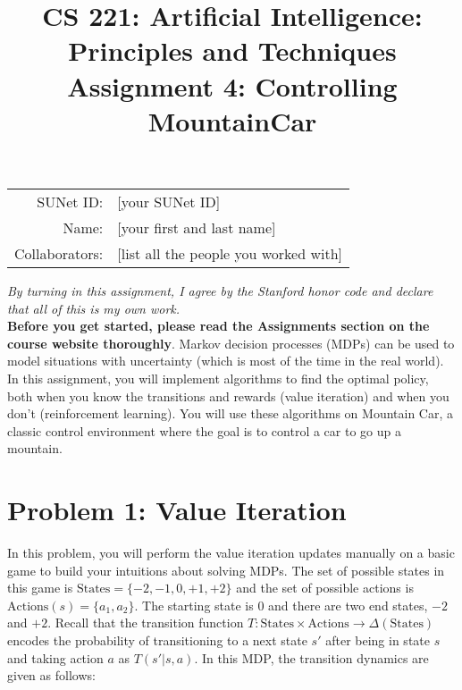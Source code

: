 \documentclass{article}
\title{\textbf{CS 221: Artificial Intelligence:\\ Principles and Techniques} \\Assignment 4: Controlling MountainCar}
\theoremstyle{case}
\theoremstyle{definition}
\begin{document}
\newtheorem*{lemma}{Lemma}

\maketitle

\begin{center}
\begin{tabular}{rl}
SUNet ID: & [your SUNet ID] \\
Name: & [your first and last name] \\
Collaborators: & [list all the people you worked with]
\end{tabular}
\end{center}
\textit{By turning in this assignment, I agree by the Stanford honor code and declare
that all of this is my own work.} \\
\fontsize{12pt}{16pt}\selectfont
\textbf{Before you get started, please read the Assignments section on the course website thoroughly}.
\newline
\newline
Markov decision processes (MDPs) can be used to model situations with uncertainty
(which is most of the time in the real world).
In this assignment, you will implement algorithms to find the optimal policy,
both when you know the transitions and rewards (value iteration)
and when you don't (reinforcement learning).
You will use these algorithms on Mountain Car, a classic control environment
where the goal is to control a car to go up a mountain.

\newpage
\section*{Problem 1: Value Iteration}

In this problem, you will perform the value iteration updates manually on a basic game to build your intuitions about solving MDPs.
The set of possible states in this game is $\text{States} = \{-2, -1, 0, +1, +2\}$ and the set of possible actions is $\text{Actions}(s) = \{a_1, a_2\}$.
The starting state is $0$ and there are two end states, $-2$ and $+2$. Recall that the transition function $T: \text{States} \times \text{Actions} \rightarrow \Delta(\text{States})$
encodes the probability of transitioning to a next state $s'$ after being in state $s$ and taking action $a$ as $T(s'|s,a)$.
In this MDP, the transition dynamics are given as follows:
\newline
\end{document}
